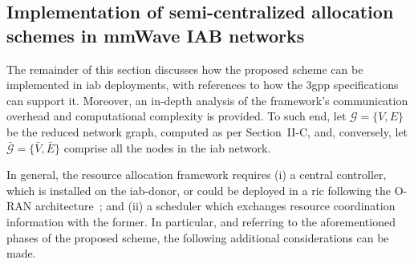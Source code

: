 \subsection{Implementation of semi-centralized allocation schemes in mmWave IAB networks}
\label{Sec:ns3-impl}

The remainder of this section discusses how the proposed scheme can be implemented in \gls{iab} deployments, with references to how the \gls{3gpp} specifications can support it. Moreover, an in-depth analysis of the framework's communication overhead and computational complexity is provided. To such end, let $\mathcal{G} = \{ V, E \}$ be the reduced network graph, computed as per Section~II-C, and, conversely, let $\mathcal{\bar{G}} = \{ \bar{V}, \bar{E} \}$ comprise all the nodes in the \gls{iab} network.

In general, the resource allocation framework requires (i) a central controller, which is installed on the \gls{iab}-donor, or could be deployed in a \gls{ric} following the O-RAN architecture~\cite{bonati2020open}; and (ii) a scheduler which exchanges resource coordination information with the former. %
In particular, and referring to the aforementioned phases of the proposed scheme, the following %
additional considerations can be made. 


